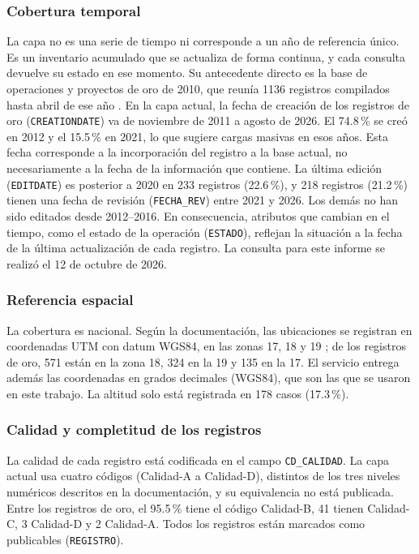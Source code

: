 \documentclass[man,12pt,a4paper,floatsintext,donotrepeattitle]{apa7}
\begin{document}
\subsubsection{Cobertura temporal}

La capa no es una serie de tiempo ni corresponde a un año de referencia único.
Es un inventario acumulado que se actualiza de forma continua, y cada consulta
devuelve su estado en ese momento. Su antecedente directo es la base de
operaciones y proyectos de oro de 2010, que reunía 1136 registros compilados
hasta abril de ese año \parencite{huanacuni2010guia}. En la capa actual, la
fecha de creación de los registros de oro (\texttt{CREATIONDATE}) va de
noviembre de 2011 a agosto de 2026. El 74.8\,\% se creó en 2012 y el 15.5\,\%
en 2021, lo que sugiere cargas masivas en esos años. Esta fecha corresponde a la
incorporación del registro a la base actual, no necesariamente a la fecha de
la información que contiene. La última edición (\texttt{EDITDATE}) es posterior
a 2020 en 233 registros (22.6\,\%), y 218 registros (21.2\,\%) tienen una fecha
de revisión (\texttt{FECHA\_REV}) entre 2021 y 2026. Los demás no han sido
editados desde 2012--2016. En consecuencia, atributos que cambian en el tiempo,
como el estado de la operación (\texttt{ESTADO}), reflejan la situación a la
fecha de la última actualización de cada registro. La consulta para este
informe se realizó el 12 de octubre de 2026.

\subsubsection{Referencia espacial}

La cobertura es nacional. Según la documentación, las ubicaciones se registran
en coordenadas UTM con datum WGS84, en las zonas 17, 18 y 19
\parencite{ingemmet2026servicio}; de los registros de oro, 571 están en la zona
18, 324 en la 19 y 135 en la 17. El servicio entrega además las coordenadas en
grados decimales (WGS84), que son las que se usaron en este trabajo. La altitud
solo está registrada en 178 casos (17.3\,\%).

\subsubsection{Calidad y completitud de los registros}

La calidad de cada registro está codificada en el campo \texttt{CD\_CALIDAD}. La
capa actual usa cuatro códigos (Calidad-A a Calidad-D), distintos de los tres
niveles numéricos descritos en la documentación, y su equivalencia no está
publicada. Entre los registros de oro, el 95.5\,\% tiene el código Calidad-B, 41
tienen Calidad-C, 3 Calidad-D y 2 Calidad-A. Todos los registros están marcados
como publicables (\texttt{REGISTRO}).
\end{document}
